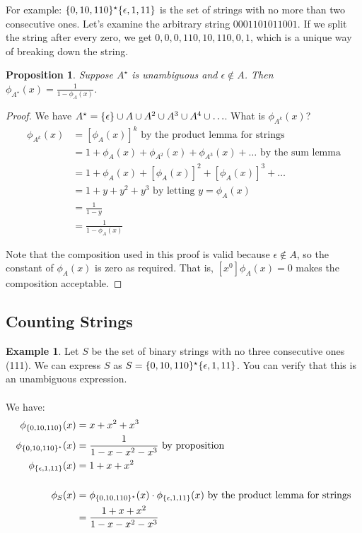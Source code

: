 \documentclass[]{article}
\newtheorem*{proposition}{Proposition}
\theoremstyle{definition}
\newtheorem{ex}{Example}[section]
\newcommand{\lecture}[1]{\marginpar{{\footnotesize $\leftarrow$ \underline{#1}}}}
\DeclarePairedDelimiter{\set}{\lbrace}{\rbrace}
\begin{document}
			For example: $\set{0, 10, 110}^\star \set{\epsilon, 1, 11}$ is the set of strings with no more than two consecutive ones. Let's examine the arbitrary string $0001101011001$. If we split the string after every zero, we get $0,0,0,110,10,110,0,1$, which is a unique way of breaking down the string.

			\begin{proposition}
				Suppose $A^\star$ is unambiguous and $\epsilon \not \in A$. Then $\phi_{A^\star}(x) = \frac{1}{1 - \phi_A(x)}$.
				\label{proposition:unambiguousstar}
			\end{proposition}

			\begin{proof}
				We have $A^\star = \set{\epsilon} \cup A \cup A^2 \cup A^3 \cup A^4 \cup \ldots$. What is $\phi_{A^k}(x)$?
				\begin{align*}
					\phi_{A^k}(x) &= [\phi_A(x)]^k \text{ by the product lemma for strings} \\
					&= 1 + \phi_A(x) + \phi_{A^2}(x) + \phi_{A^3}(x) + \ldots \text{ by the sum lemma} \\
					&= 1 + \phi_A(x) + [\phi_A(x)]^2 + [\phi_A(x)]^3 + \ldots \\
					&= 1 + y + y^2 + y^3 \text{ by letting } y = \phi_A(x) \\
					&= \frac{1}{1 - y} \\
					&= \frac{1}{1 - \phi_A(x)}
				\end{align*}

				Note that the composition used in this proof is valid because $\epsilon \not \in A$, so the constant of $\phi_A(x)$ is zero as required. That is, $[x^0]\phi_A(x) = 0$ makes the composition acceptable.
			\end{proof}
		\subsection{Counting Strings} \lecture{January 30, 2013}
			\begin{ex}
				Let $S$ be the set of binary strings with no three consecutive ones (111). We can express $S$ as $S = \set{0, 10, 110 }^\star \set{\epsilon, 1, 11}$. You can verify that this is an unambiguous expression.
				\\ \\
				We have:
				\begin{align*}
					\phi_{\set{0, 10, 110}}(x) &= x + x^2 + x^3 \\
					\phi_{\set{0, 10, 110}^\star}(x) &= \frac{1}{1 - x - x^2 - x^3} \text{ by proposition} \\
					\phi_{\set{\epsilon, 1, 11}}(x) &= 1 + x + x^2 \\ \\
					\phi_S(x) &= \phi_{\set{0, 10, 110}^\star}(x) \cdot \phi_{\set{\epsilon, 1, 11}}(x) \text{ by the product lemma for strings} \\
					&= \frac{1 + x + x^2}{1 - x - x^2 - x^3}
				\end{align*}
			\end{ex}
\end{document}
